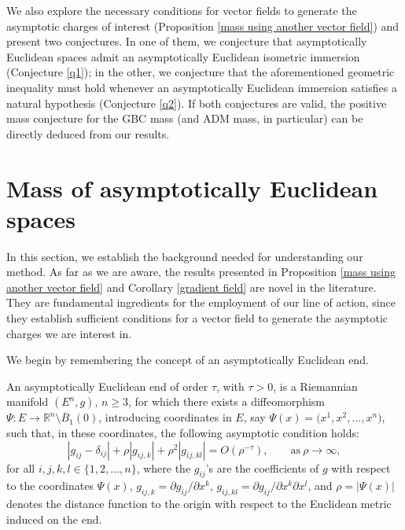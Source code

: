 \documentclass[pdftex]{sigma}
\numberwithin{equation}{section}
\begin{document}
We also explore the necessary conditions for vector fields to generate
the asymptotic charges of interest (Proposition \ref{mass using another vector field})
and present two conjectures. In one of them, we conjecture that asymptotically Euclidean
spaces admit an asymptotically Euclidean isometric immersion (Conjecture
\ref{q1}); in the other, we conjecture that the aforementioned geometric inequality must hold
whenever an asymptotically Euclidean immersion satisfies a natural hypothesis
(Conjecture \ref{q2}). If both conjectures are valid, the positive mass
conjecture for the GBC mass (and ADM mass, in particular) can be directly deduced
from our results.

\section{Mass of asymptotically Euclidean spaces}

In this section, we establish the background needed for understanding
our method. As far as we are aware, the results presented
in Proposition \ref{mass using another vector field} and Corollary
\ref{gradient field} are novel in the literature. They are fundamental ingredients
for the employment of our line of action, since they establish sufficient conditions
for a vector field to generate the asymptotic charges we are interest in.

We begin by remembering the concept of an asymptotically Euclidean end.
\begin{Definition}
 An asymptotically Euclidean end of order
 $\tau$, with \(\tau > 0\), is a Riemannian
 manifold $(E^n,g)$, $n \geq 3$, for which there exists a diffeomorphism
 $\Psi\colon E \to \mathbb{R}^n \setminus \overline{B}_1(0)$, introducing coordinates
 in $E$, say $\Psi(x) = \bigl(x^1,x^2, \ldots, x^n\bigr)$, such that, in these coordinates,
 the following asymptotic condition holds:
 \begin{equation} \label{decay conditions}
  |g_{ij} - \delta_{ij}| + \rho|g_{ij,k}| + \rho^2 |g_{ij,kl}| = O (\rho^{-\tau}), \qquad
  \text{as}\ \rho \to \infty,
 \end{equation}
 for all $i,j,k,l \in \lbrace 1, 2, \ldots, n \rbrace$,
 where the $g_{ij}$'s are the coefficients of $g$ with respect to the coordinates
 \(\Psi(x)\), $g_{ij,k} = \partial g_{ij} / \partial x^k$,
 $g_{ij,kl} = \partial g_{ij} / \partial x^k \partial x^l$,
 and \(\rho = |\Psi(x)|\) denotes
 the distance function to the origin with respect
 to the Euclidean metric induced on the end.
\end{Definition}
\end{document}
